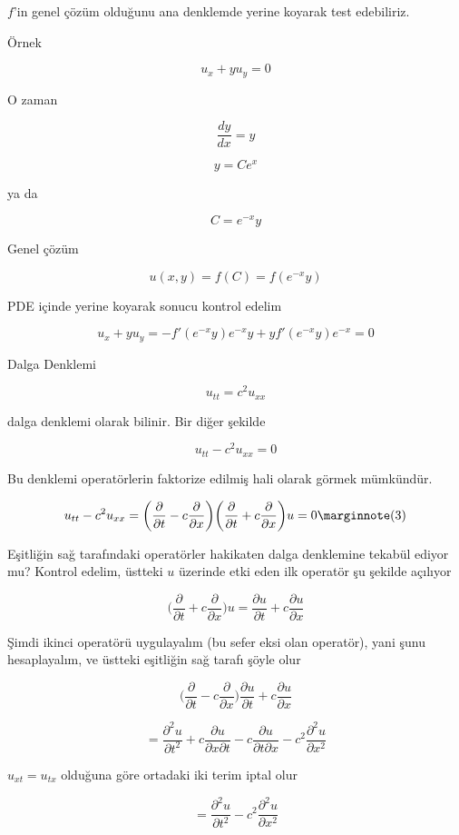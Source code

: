 \documentclass[12pt,fleqn]{article}\usepackage{../../common}
\begin{document}
$f$'in genel çözüm olduğunu ana denklemde yerine koyarak test edebiliriz.

Örnek 

$$ u_x + yu_y = 0 $$

O zaman 

$$ \frac{dy}{dx} = y $$

$$ y = Ce^x $$

ya da

$$  C = e^{-x}y$$

Genel çözüm 

$$ u(x,y) = f(C) = f(e^{-x}y) $$

PDE içinde yerine koyarak sonucu kontrol edelim

$$ u_x + yu_y = 
-f'(e^{-x}y)e^{-x}y + y f'(e^{-x}y) e^{-x} = 0
 $$

Dalga Denklemi 

$$ u_{tt} = c^2 u_{xx} $$

dalga denklemi olarak bilinir. Bir diğer şekilde 

$$ u_{tt} - c^2 u_{xx} = 0$$

Bu denklemi operatörlerin faktorize edilmiş hali olarak görmek mümkündür. 

$$ u_{tt} - c^2 u_{xx} = 
\bigg( \frac{\partial }{\partial t} - c \frac{\partial }{\partial x} \bigg)
\bigg( \frac{\partial }{\partial t} + c \frac{\partial }{\partial x} \bigg)
u = 0
\mlabel{3}
$$

Eşitliğin sağ tarafındaki operatörler hakikaten dalga denklemine tekabül
ediyor mu? Kontrol edelim, üstteki $u$ üzerinde etki eden ilk operatör şu
şekilde açılıyor

$$ \bigg( \frac{\partial }{\partial t} + c \frac{\partial }{\partial x}
\bigg) u = 
\frac{\partial u}{\partial t} + c \frac{\partial u}{\partial x}
$$

Şimdi ikinci operatörü uygulayalım (bu sefer eksi olan operatör), yani şunu
hesaplayalım, ve üstteki eşitliğin sağ tarafı şöyle olur

$$ 
\bigg( \frac{\partial }{\partial t} - c \frac{\partial }{\partial x} \bigg)
\frac{\partial u}{\partial t} + c \frac{\partial u}{\partial x} 
 $$

$$ = 
\frac{\partial ^2 u}{\partial t^2} + 
c \frac{\partial u}{\partial x \partial t} - 
c \frac{\partial u}{\partial t \partial x} - 
c^2\frac{\partial ^2 u}{\partial x^2} 
 $$

$u_{xt} = u_{tx}$ olduğuna göre ortadaki iki terim iptal olur

$$ = 
\frac{\partial ^2 u}{\partial t^2} -
c^2\frac{\partial ^2 u}{\partial x^2} 
 $$
\end{document}
